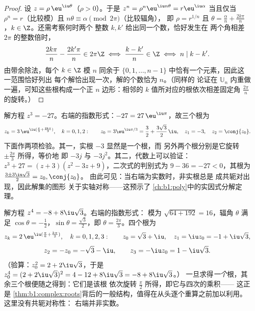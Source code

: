 \begin{proof}
设 $z = \rho\,\eu^{\iu\theta}$（$\rho > 0$）。于是 $z^n =
\rho^n \eu^{\iu n\theta} = r \eu^{\iu\alpha}$ 当且仅当 $\rho^n
= r$（比较模）且 $n\theta \equiv \alpha \pmod{2\pi}$（比较辐角），
即 $\rho = r^{1/n}$ 且 $\theta = \frac{\alpha}{n} +
\frac{2k\pi}{n}$，$k \in \Z$。还需考察何时两个
整数 $k, k'$ 给出同一个数，恰好发生在
两个角相差 $2\pi$ 的整数倍时，
\[
\frac{2k\pi}n - \frac{2k'\pi}n \in 2\pi\Z
\iff \frac{k - k'}n \in \Z
\iff n \mid k - k' .
\]
由带余除法，每个 $k \in \Z$ 模 $n$ 同余于
$\{0, 1, \dots, n-1\}$ 中恰有一个元素，因此这一范围恰好列出
每个解恰出现一次，解的个数恰为 $n$。（同样的
论证在 $\mathbb U_n$ 内重做一遍，可知这些根构成一个正
$n$ 边形：相邻的 $k$ 值所对应的根依次相差固定角
$\frac{2\pi}n$ 的旋转。）
\end{proof}

\begin{example}[$-27$ 的立方根]\label{ex:b1:complex:cuberoots}
解方程 $z^3 = -27$。右端的指数形式：$-27 =
27\,\eu^{\iu\pi}$，故三个根为
\[
z_k = 3\,\eu^{\iu(\frac\pi3 + \frac{2k\pi}3)}, \quad k = 0, 1, 2 :
\qquad
z_0 = 3\eu^{\iu\pi/3} = \frac32 + \frac{3\sqrt3}2\,\iu,
\quad
z_1 = -3,
\quad
z_2 = \conj{z_0} .
\]
下面作两项检验。其一，实根 $-3$ 显然是一个根，而
另外两个根分别是它旋转 $\pm\frac{2\pi}3$ 所得，等价地
即 $-3j$ 与 $-3j^2$。其二，代数上可以验证：$z^3 + 27 = (z +
3)(z^2 - 3z + 9)$，二次式的判别式为 $9 - 36 =
-27 < 0$，其根为 $\frac{3 \pm 3\iu\sqrt3}2 = z_0, \conj{z_0}$。
由此可见：当右端为实数时，非实根总是
成共轭对出现，因此解集的图形
关于实轴对称——这预示了
\cref{ch:b1:poly}中的实因式分解定理。
\end{example}

\begin{example}[右端为非实数的情形]\label{ex:b1:complex:fourthroots}
解方程 $z^4 = -8 + 8\iu\sqrt3$。右端的指数形式：
模为 $\sqrt{64 + 192} = 16$，辐角 $\theta$ 满足
$\cos\theta = -\frac12$，$\sin\theta = \frac{\sqrt3}2$，即
$\theta = \frac{2\pi}3$。四个根为
\[
z_k = 2\,\eu^{\iu(\frac\pi6 + \frac{k\pi}2)}, \quad k = 0, 1, 2,
3 :
\qquad
z_0 = \sqrt3 + \iu,\quad z_1 = \iu z_0 = -1 + \iu\sqrt3,
\]
\[
z_2 = -z_0 = -\sqrt3 - \iu,\qquad z_3 = -\iu z_0 = 1 - \iu\sqrt3 .
\]
（验算：$z_0^2 = 2 + 2\iu\sqrt3$，于是 $z_0^4 = (2 +
2\iu\sqrt3)^2 = 4 - 12 + 8\iu\sqrt3 = -8 + 8\iu\sqrt3$。）
一旦求得\emph{一个}根，其余三个根便随之得到：它们是该根
依次旋转 $\frac\pi2$ 所得，即它与四次的乘积——
这正是
\cref{thm:b1:complex:roots}背后的一般结构，值得在从头逐个重算之前加以利用。
这里没有共轭对称性：
右端并非实数。
\end{example}

